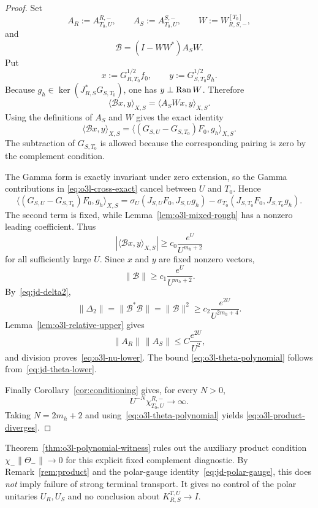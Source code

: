 \begin{proof}
Set
\[
 A_R:=A_{T_0,U}^{R,-},\qquad
 A_S:=A_{T_0,U}^{S,-},\qquad
 W:=W_{R,S,-}^{[T_0]},
\]
and
\[
 \mathscr B=(I-WW^*)A_SW.
\]
Put
\[
 x:=G_{R,T_0}^{1/2}f_0,
 \qquad
 y:=G_{S,T_0}^{1/2}g_h.
\]
Because $g_h\in\ker(J_{R,S}^*G_{S,T_0})$, one has
$y\perp\operatorname{Ran} W$.  Therefore
\[
 \langle\mathscr Bx,y\rangle_{X,S}
 =\langle A_SWx,y\rangle_{X,S}.
\]
Using the definitions of $A_S$ and $W$ gives the exact identity
\[
 \boxed{
 \langle\mathscr Bx,y\rangle_{X,S}
 =\langle(G_{S,U}-G_{S,T_0})F_0,g_h\rangle_{X,S}.
 }
\tag{O3L.7}\label{eq:o3l-cross-exact}
\]
The subtraction of $G_{S,T_0}$ is allowed because the corresponding pairing is zero by
the complement condition.

The Gamma form is exactly invariant under zero extension, so the Gamma contributions in
\eqref{eq:o3l-cross-exact} cancel between $U$ and $T_0$.  Hence
\[
 \langle(G_{S,U}-G_{S,T_0})F_0,g_h\rangle_{X,S}
 =\sigma_U(J_{S,U}F_0,J_{S,U}g_h)
  -\sigma_{T_0}(J_{S,T_0}F_0,J_{S,T_0}g_h).
\]
The second term is fixed, while Lemma~\ref{lem:o3l-mixed-rough} has a nonzero leading
coefficient.  Thus
\[
 |\langle\mathscr Bx,y\rangle_{X,S}|
 \ge c_0\frac{e^U}{U^{m_h+2}}
\]
for all sufficiently large $U$.  Since $x$ and $y$ are fixed nonzero vectors,
\[
 \|\mathscr B\|
 \ge c_1\frac{e^U}{U^{m_h+2}}.
\tag{O3L.8}\label{eq:o3l-B-lower}
\]
By~\eqref{eq:jd-delta2},
\[
 \|\Delta_2\|=\|\mathscr B^*\mathscr B\|=\|\mathscr B\|^2
 \ge c_2\frac{e^{2U}}{U^{2m_h+4}}.
\tag{O3L.9}\label{eq:o3l-delta-lower}
\]
Lemma~\ref{lem:o3l-relative-upper} gives
\[
 \|A_R\|\,\|A_S\|\le C\frac{e^{2U}}{U^2},
\]
and division proves~\eqref{eq:o3l-nu-lower}.  The bound
\eqref{eq:o3l-theta-polynomial} follows from~\eqref{eq:jd-theta-lower}.

Finally Corollary~\ref{cor:conditioning} gives, for every $N>0$,
\[
 U^{-N}\chi_{T_0,U}^{R,-}\to\infty.
\]
Taking $N=2m_h+2$ and using~\eqref{eq:o3l-theta-polynomial} yields
\eqref{eq:o3l-product-diverges}.
\end{proof}

\begin{remark}[R13 firewall]\label{rem:o3l-firewall}
Theorem~\ref{thm:o3l-polynomial-witness} rules out the auxiliary product condition
$\chi_-\|\Theta_-\|\to0$ for this explicit fixed complement diagnostic.  By
Remark~\ref{rem:product} and the polar-gauge identity~\eqref{eq:jd-polar-gauge}, this does
\emph{not} imply failure of strong terminal transport.  It gives no control of the polar
unitaries $U_R,U_S$ and no conclusion about $K_{R,S}^{T,U}\to I$.
\end{remark}
